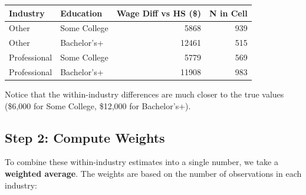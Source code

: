 \documentclass[
  letterpaper,
  DIV=11,
  numbers=noendperiod]{scrreprt}
\newenvironment{Shaded}{\begin{snugshade}}{\end{snugshade}}
\newcommand{\AttributeTok}[1]{\textcolor[rgb]{0.40,0.45,0.13}{#1}}
\newcommand{\DecValTok}[1]{\textcolor[rgb]{0.68,0.00,0.00}{#1}}
\newcommand{\FunctionTok}[1]{\textcolor[rgb]{0.28,0.35,0.67}{#1}}
\newcommand{\NormalTok}[1]{\textcolor[rgb]{0.00,0.23,0.31}{#1}}
\newcommand{\OtherTok}[1]{\textcolor[rgb]{0.00,0.23,0.31}{#1}}
\newcommand{\SpecialCharTok}[1]{\textcolor[rgb]{0.37,0.37,0.37}{#1}}
\newcommand{\StringTok}[1]{\textcolor[rgb]{0.13,0.47,0.30}{#1}}
\newcounter{none} %
\begin{document}
\begin{Shaded}
\end{Shaded}

{\def\LTcaptype{none} %
\begin{longtable}[]{@{}llrr@{}}
\toprule\noalign{}
Industry & Education & Wage Diff vs HS (\$) & N in Cell \\
\midrule\noalign{}
\endhead
\bottomrule\noalign{}
\endlastfoot
Other & Some College & 5868 & 939 \\
Other & Bachelor's+ & 12461 & 515 \\
Professional & Some College & 5779 & 569 \\
Professional & Bachelor's+ & 11908 & 983 \\
\end{longtable}
}

Notice that the within-industry differences are much closer to the true
values (\$6,000 for Some College, \$12,000 for Bachelor's+).

\subsection{Step 2: Compute Weights}\label{step-2-compute-weights}

To combine these within-industry estimates into a single number, we take
a \textbf{weighted average}. The weights are based on the number of
observations in each industry:
\end{document}
